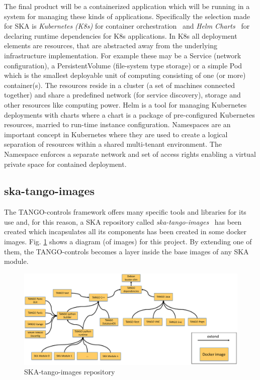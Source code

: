 \documentclass[a4paper,
               keeplastbox,   %
               ]{jacow}
\begin{document}
The final product will be a containerized application which will be running in a system for managing these kinds of applications. Specifically the selection made for SKA is \textit{Kubernetes (K8s)} for container orchestration~\cite{kubernetes} and \textit{Helm Charts}~\cite{helm} for declaring runtime dependencies for K8s applications. In K8s all deployment elements are resources, that are abstracted away from the underlying infrastructure implementation. For example these may be a Service (network configuration), a PersistentVolume (file-system type storage) or a simple Pod which is the smallest deployable unit of computing consisting of one (or more) container(s). The resources reside in a cluster (a set of machines connected together) and share a predefined network (for service discovery), storage and other resources like computing power. 
Helm is a tool for managing Kubernetes deployments with charts where a chart is a package of pre-configured Kubernetes resources, married to run-time instance configuration.  Namespaces are an important concept in Kubernetes where they are used to create a logical separation of resources within a shared multi-tenant environment. The Namespace enforces a separate network and set of access rights enabling a virtual private space for contained deployment.


\subsection{ska-tango-images} 

The TANGO-controls framework offers many specific tools and libraries for its use and, for this reason, a SKA repository called \textit{ska-tango-images}~\cite{ska-tango-images} has been created which incapsulates all its components has been created in some docker images. Fig. \ref{fig:ska-tango-images} shows a diagram (of images) for this project. By extending one of them, the TANGO-controls becomes a layer inside the base images of any SKA module. 

\begin{figure}[!htb]
   \centering
   \includegraphics*[width=0.8\columnwidth]{ska-tango-images}
   \caption{SKA-tango-images repository}
   \label{fig:ska-tango-images}
\end{figure}
\end{document}
